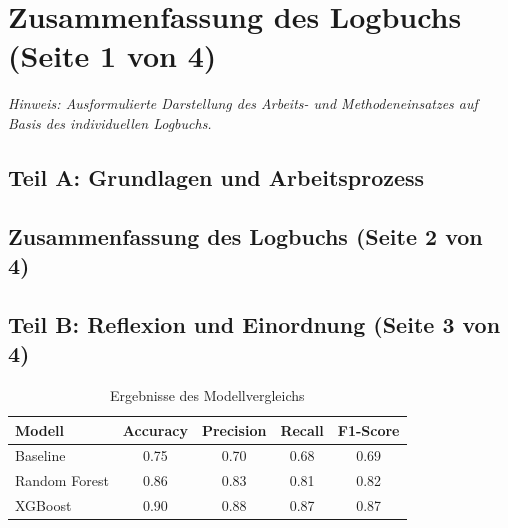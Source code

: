\documentclass[11pt,a4paper]{article}
\begin{document}
\newpage
{}

\tableofcontents
\newpage

\section{Zusammenfassung des Logbuchs (Seite 1 von 4)}
\label{sec:zusammenfassung}

\textit{Hinweis: Ausformulierte Darstellung des Arbeits- und Methodeneinsatzes auf Basis des individuellen Logbuchs.}

\subsection{Teil A: Grundlagen und Arbeitsprozess}
\lipsum[1-3]

\newpage
\subsection*{Zusammenfassung des Logbuchs (Seite 2 von 4)}
\lipsum[4-6]

\newpage
\subsection{Teil B: Reflexion und Einordnung (Seite 3 von 4)}
\lipsum[7-8]

\begin{table}[htbp]
    \centering
    \caption{Ergebnisse des Modellvergleichs}
    \label{tab:ergebnisse}
    \begin{tabular}{lcccc}
        \toprule
        \textbf{Modell} & \textbf{Accuracy} & \textbf{Precision} & \textbf{Recall} & \textbf{F1-Score} \\
        \midrule
        Baseline & 0.75 & 0.70 & 0.68 & 0.69 \\
        Random Forest & 0.86 & 0.83 & 0.81 & 0.82 \\
        XGBoost & 0.90 & 0.88 & 0.87 & 0.87 \\
        \bottomrule
    \end{tabular}
\end{table}
\end{document}
